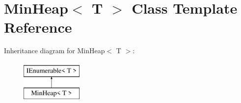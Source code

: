 \hypertarget{class_min_heap}{}\section{Min\+Heap$<$ T $>$ Class Template Reference}
\label{class_min_heap}
Inheritance diagram for Min\+Heap$<$ T $>$\+:\begin{figure}[H]
\begin{center}
\leavevmode
\includegraphics[height=2.000000cm]{class_min_heap}
\end{center}
\end{figure}
